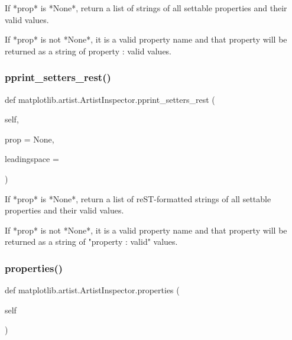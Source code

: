 \begin{DoxyVerb}If *prop* is *None*, return a list of strings of all settable
properties and their valid values.

If *prop* is not *None*, it is a valid property name and that
property will be returned as a string of property : valid
values.
\end{DoxyVerb}
 \mbox{\label{classmatplotlib_1_1artist_1_1ArtistInspector_a7d50c764584389275f84c1e92ab27e12}} 
\subsubsection{\texorpdfstring{pprint\+\_\+setters\+\_\+rest()}{pprint\_setters\_rest()}}
{\footnotesize\ttfamily def matplotlib.\+artist.\+Artist\+Inspector.\+pprint\+\_\+setters\+\_\+rest (\begin{DoxyParamCaption}\item[{}]{self,  }\item[{}]{prop = {\ttfamily None},  }\item[{}]{leadingspace = {} }\end{DoxyParamCaption})}

\begin{DoxyVerb}If *prop* is *None*, return a list of reST-formatted strings of all
settable properties and their valid values.

If *prop* is not *None*, it is a valid property name and that
property will be returned as a string of "property : valid"
values.
\end{DoxyVerb}
 \mbox{\label{classmatplotlib_1_1artist_1_1ArtistInspector_a29e16c69d2062d22a3e96d21217d6666}} 
\subsubsection{\texorpdfstring{properties()}{properties()}}
{\footnotesize\ttfamily def matplotlib.\+artist.\+Artist\+Inspector.\+properties (\begin{DoxyParamCaption}\item[{}]{self }\end{DoxyParamCaption})}

